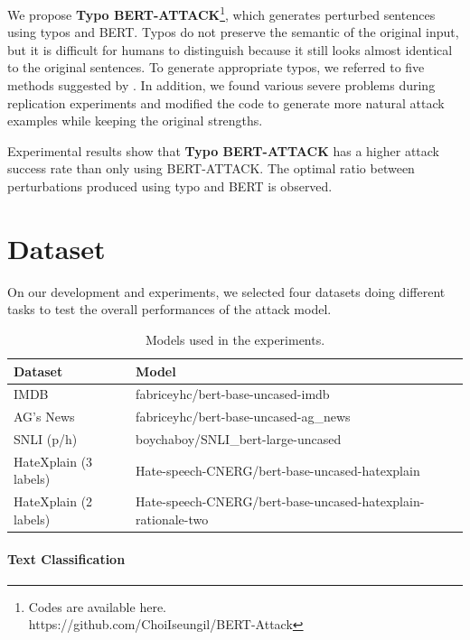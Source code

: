 \documentclass[11pt,a4paper]{article}
\begin{document}
We propose \textbf{Typo BERT-ATTACK}\footnote{Codes are available here.\\https://github.com/ChoiIseungil/BERT-Attack}, which generates perturbed sentences using typos and BERT. Typos do not preserve the semantic of the original input, but it is difficult for humans to distinguish because it still looks almost identical to the original sentences. To generate appropriate typos, we referred to five methods suggested by \citet{Hagen:17}. In addition, we found various severe problems during replication experiments and modified the code to generate more natural attack examples while keeping the original strengths. 

Experimental results show that \textbf{Typo BERT-ATTACK} has a higher attack success rate than only using BERT-ATTACK. The optimal ratio between perturbations produced using typo and BERT is observed. 

\section{Dataset}

On our development and experiments, we selected four datasets doing different tasks to test the overall performances of the attack model. 
\begin{table}[]
\centering
\begin{tabular}{ll}
\hline \textbf{Dataset} & \textbf{Model} \\ \hline
IMDB                  & fabriceyhc/bert-base-uncased-imdb \\
AG's News             & fabriceyhc/bert-base-uncased-ag\_news  \\
SNLI (p/h)            & boychaboy/SNLI\_bert-large-uncased  \\
HateXplain (3 labels) & Hate-speech-CNERG/bert-base-uncased-hatexplain \\
HateXplain (2 labels) & Hate-speech-CNERG/bert-base-uncased-hatexplain-rationale-two \\
\hline
\end{tabular}
\caption{\label{Model-table} Models used in the experiments. }
\end{table}

\paragraph{Text Classification}
\end{document}
